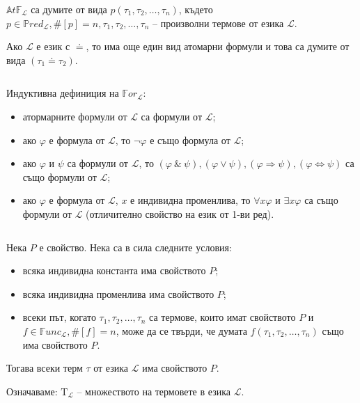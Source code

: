 \documentclass{article}
\newcommand{\Tau}{\mathrm{T}}
\begin{document}
\begin{mydef}
$\ $

$\mathbb{A}t\mathbb{F}_\mathcal{L}$ са думите от вида $p(\tau_1, \tau_2, \ldots, \tau_n)$, където $p \in \mathbb{P}red_\mathcal{L}, \#[p] = n, \tau_1, \tau_2, \ldots, \tau_n$ -- произволни термове от езика $\mathcal{L}$.

Ако $\mathcal{L}$ е език с $\doteq$, то има още един вид атомарни формули и това са думите от вида $(\tau_1 \doteq \tau_2)$.
\end{mydef}

\begin{mydef}[Формули]
$\ $

Индуктивна дефиниция на $\mathbb{F}or_\mathcal{L}$:
\begin{itemize}
\item атормарните формули от $\mathcal{L}$ са формули от $\mathcal{L}$;
\item ако $\varphi$ е формула от $\mathcal{L}$, то $\neg\varphi$ е също формула от $\mathcal{L}$;
\item ако $\varphi$ и $\psi$ са формули от $\mathcal{L}$, то $(\varphi\ \&\ \psi), (\varphi \lor \psi), (\varphi \Rightarrow \psi), (\varphi	\Leftrightarrow \psi)$ са също формули от $\mathcal{L}$;
\item ако $\varphi$ е формула от $\mathcal{L}$, $x$ е индивидна променлива, то $\forall x \varphi$ и $\exists x \varphi$ са също формули от $\mathcal{L}$ (отличително свойство на език от 1-ви ред).
\end{itemize}

\end{mydef}

\begin{mydef}
$\ $

Нека $P$ е свойство.
Нека са в сила следните условия:
\begin{itemize}
\item всяка индивидна константа има свойството $P$;
\item всяка индивидна променлива има свойството $P$;
\item всеки път, когато $\tau_1, \tau_2, \ldots, \tau_n$ са термове, които имат свойството $P$ и $f \in \mathbb{F}unc_\mathcal{L}, \#[f] = n$, може да се твърди, че думата $f(\tau_1, \tau_2, \ldots, \tau_n)$ също има свойството $P$.
\end{itemize}

Тогава всеки терм $\tau$ от езика $\mathcal{L}$ има свойството $P$. 

Означаваме: $\Tau_\mathcal{L}$ -- множеството на термовете в езика $\mathcal{L}$.
\end{mydef}
\end{document}
